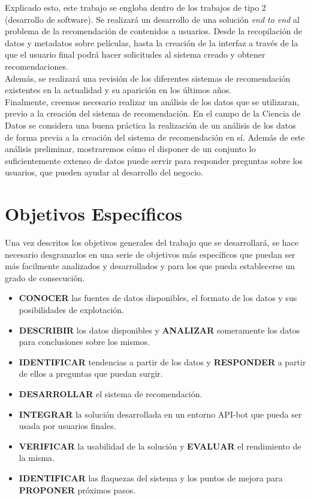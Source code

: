 Explicado esto, este trabajo se engloba dentro de los trabajos de tipo 2 (desarrollo de software). Se realizará un desarrollo de una solución \textit{end to end} al problema de la recomendación de contenidos a usuarios. Desde la recopilación de datos y metadatos sobre películas, hasta la creación de la interfaz a través de la que el usuario final podrá hacer solicitudes al sistema creado y obtener recomendaciones.\\

Además, se realizará una revisión de los diferentes sistemas de recomendación existentes en la actualidad y su aparición en los últimos años.\\

Finalmente, creemos necesario realizar un análisis de los datos que se utilizaran, previo a la creación del sistema de recomendación. En el campo de la Ciencia de Datos se considera una buena práctica la realización de un análisis de los datos de forma previa a la creación del sistema de recomendación en sí. Además de este análisis preliminar, mostraremos cómo el disponer de un conjunto lo suficientemente extenso de datos puede servir para responder preguntas sobre los usuarios, que pueden ayudar al desarrollo del negocio.\\


\section{Objetivos Específicos}\label{sec:objespecificos}

Una vez descritos los objetivos generales del trabajo que se desarrollará, se hace necesario desgranarlos en una serie de objetivos más específicos que puedan ser más facilmente analizados y desarrollados y para los que pueda establecerse un grado de consecución.

\begin{itemize}
    \item \textbf{CONOCER} las fuentes de datos disponibles, el formato de los datos y sus posibilidades de explotación.
    \item \textbf{DESCRIBIR} los datos disponibles y \textbf{ANALIZAR} someramente los datos para conclusiones sobre los mismos.
    \item \textbf{IDENTIFICAR} tendencias a partir de los datos y \textbf{RESPONDER} a partir de ellos a preguntas que puedan surgir.
    \item \textbf{DESARROLLAR} el sistema de recomendación.
    \item \textbf{INTEGRAR} la solución desarrollada en un entorno API-bot que pueda ser usada por usuarios finales.
    \item \textbf{VERIFICAR} la usabilidad de la solución y \textbf{EVALUAR} el rendimiento de la misma.
    \item \textbf{IDENTIFICAR} las flaquezas del sistema y los puntos de mejora para \textbf{PROPONER} próximos pasos.
\end{itemize}

